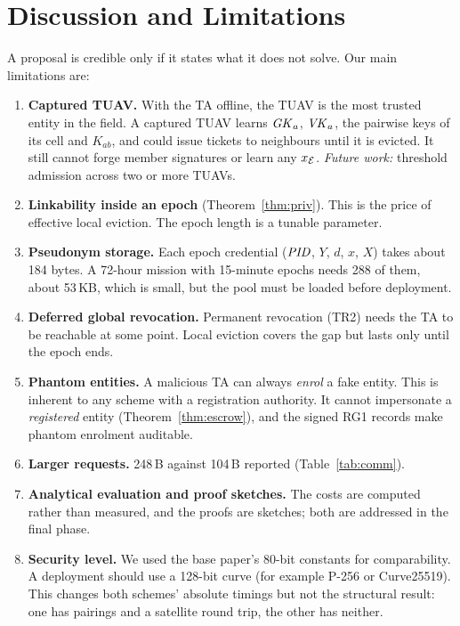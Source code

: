 \section{Discussion and Limitations}\label{sec:discussion}
A proposal is credible only if it states what it does not solve. Our main limitations are:

\begin{enumerate}[label=\textbf{L\arabic*.},leftmargin=*]
  \item \textbf{Captured TUAV.} With the TA offline, the TUAV is the most trusted entity in the field. A captured TUAV learns $\mathit{GK}_a$, $\mathit{VK}_a$, the pairwise keys
        of its cell and $K_{ab}$, and could issue tickets to neighbours until it is evicted. It still cannot forge member signatures or learn any $x_{\mathcal{E}}$.
        \emph{Future work:} threshold admission across two or more TUAVs.
  \item \textbf{Linkability inside an epoch} (Theorem~\ref{thm:priv}). This is the price of effective local eviction. The epoch length is a tunable parameter.
  \item \textbf{Pseudonym storage.} Each epoch credential ($\mathit{PID}$, $Y$, $d$, $x$, $X$) takes about 184 bytes. A 72-hour mission with 15-minute epochs needs
        288 of them, about 53\,KB, which is small, but the pool must be loaded before deployment.
  \item \textbf{Deferred global revocation.} Permanent revocation (TR2) needs the TA to be reachable at some point. Local eviction covers the gap but lasts only until the epoch ends.
  \item \textbf{Phantom entities.} A malicious TA can always \emph{enrol} a fake entity. This is inherent to any scheme with a registration authority. It cannot impersonate a
        \emph{registered} entity (Theorem~\ref{thm:escrow}), and the signed RG1 records make phantom enrolment auditable.
  \item \textbf{Larger requests.} 248\,B against 104\,B reported (Table~\ref{tab:comm}).
  \item \textbf{Analytical evaluation and proof sketches.} The costs are computed rather than measured, and the proofs are sketches; both are addressed in the final phase.
  \item \textbf{Security level.} We used the base paper's 80-bit constants for comparability. A deployment should use a 128-bit curve (for example P-256 or Curve25519). This changes both
        schemes' absolute timings but not the structural result: one has pairings and a satellite round trip, the other has neither.
\end{enumerate}


